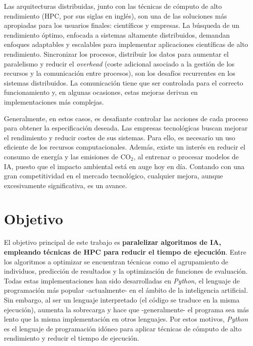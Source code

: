 	Las arquitecturas distribuidas, junto con las técnicas de cómputo de alto rendimiento (HPC, por sus siglas en inglés), son una de las soluciones más apropiadas para los usuarios finales: científicos y empresas. La búsqueda de un rendimiento óptimo, enfocada a sistemas altamente distribuidos, demandan enfoques adaptables y escalables para implementar aplicaciones científicas de alto rendimiento. Sincronizar los procesos, distribuir los datos para aumentar el paralelismo y reducir el \textit{overhead} (coste adicional asociado a la gestión de los recursos y la comunicación entre procesos), son los desafíos recurrentes en los sistemas distribuidos. La comunicación tiene que ser controlada para el correcto funcionamiento y, en algunas ocasiones, estas mejoras derivan en implementaciones más complejas.
	
	Generalmente, en estos casos, es desafiante controlar las acciones de cada proceso para obtener la especificación deseada. Las empresas tecnológicas buscan mejorar el rendimiento y reducir costes de sus sistemas. Para ello, es necesario un uso eficiente de los recursos computacionales. Además, existe un interés en reducir el consumo de energía y las emisiones de CO\(_2\), al entrenar o procesar modelos de IA, puesto que el impacto ambiental está en auge hoy en día. Contando con una gran competitividad en el mercado tecnológico, cualquier mejora, aunque excesivamente significativa, es un avance.


\section{Objetivo}

	El objetivo principal de este trabajo es \textbf{paralelizar algoritmos de IA, empleando técnicas de HPC para reducir el tiempo de ejecución}. Entre los algoritmos a optimizar se encuentran técnicas como el agrupamiento de individuos, predicción de resultados y la optimización de funciones de evaluación. Todas estas implementaciones han sido desarrolladas en \textit{Python}, el lenguaje de programación más popular -actualmente- en el ámbito de la inteligencia artificial\cite{sainin2021best}. Sin embargo, al ser un lenguaje interpretado (el código se traduce en la misma ejecución), aumenta la sobrecarga y hace que -generalmente- el programa sea más lento que la misma implementación en otros lenguajes. Por estos motivos, \textit{Python} es el lenguaje de programación idóneo para aplicar técnicas de cómputo de alto rendimiento y reducir el tiempo de ejecución.
	
